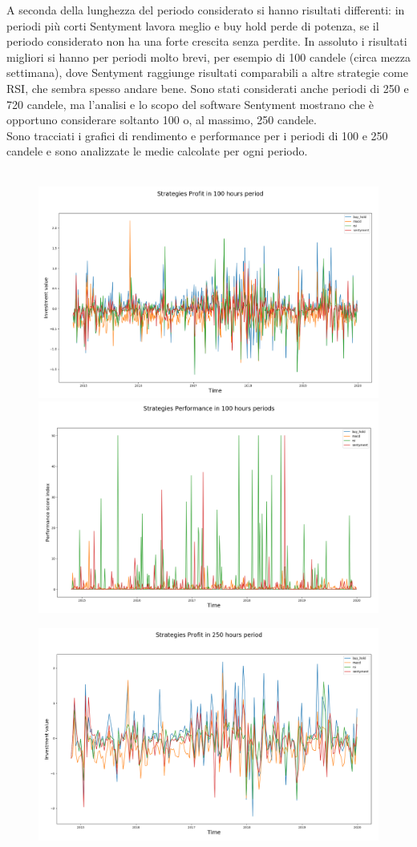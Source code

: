 \documentclass[a4paper,12pt]{report}
\begin{document}
\begin{fig}
A seconda della lunghezza del periodo considerato si hanno risultati differenti: in periodi più corti Sentyment lavora meglio e buy hold perde di potenza, se il periodo considerato non ha una forte crescita senza perdite. In assoluto i risultati migliori si hanno per periodi molto brevi, per esempio di 100 candele (circa mezza settimana), dove Sentyment raggiunge risultati comparabili a altre strategie come RSI, che sembra spesso andare bene. Sono stati considerati anche periodi di 250 e 720 candele, ma l'analisi e lo scopo del software Sentyment mostrano che è opportuno considerare soltanto 100 o, al massimo, 250 candele.\\ Sono tracciati i grafici di rendimento e performance per i periodi di 100 e 250 candele e sono analizzate le medie calcolate per ogni periodo.\\~\\
\begin{fig}
	\begin{subfigure}{\linewidth}
		\includegraphics[width=.5\linewidth]{final_gain_100}
		\includegraphics[width=.5\linewidth]{final_perf_100}
	\end{subfigure}
	\begin{subfigure}{\linewidth}
		\includegraphics[width=.5\linewidth]{final_gain_250}

\end{subfigure}
\end{fig}
\end{fig}
\end{document}
